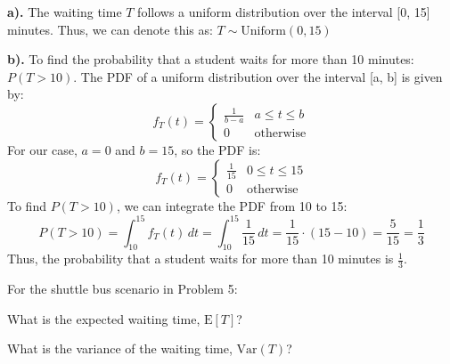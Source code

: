 \documentclass[a4paper, 10pt]{article}
\begin{document}
\begin{solution}
\textbf{a).} The waiting time \( T \) follows a uniform distribution over the interval [0, 15] minutes.
Thus, we can denote this as: \( T \sim \text{Uniform}(0, 15) \)

\vspace{3mm}

\textbf{b).} To find the probability that a student waits for more than 10 minutes: \( P(T > 10) \).
The PDF of a uniform distribution over the interval [a, b] is given by:
\[
f_T(t) = \begin{cases}
    \frac{1}{b-a} & a \leq t \leq b \\
    0 & \text{otherwise}
\end{cases}
\]
For our case, \( a = 0 \) and \( b = 15 \), so the PDF is:
\[
f_T(t) = \begin{cases}
    \frac{1}{15} & 0 \leq t \leq 15 \\
    0 & \text{otherwise}
\end{cases}
\]
To find \( P(T > 10) \), we can integrate the PDF from 10 to 15:
\[
P(T > 10) = \int_{10}^{15} f_T(t) \, dt = \int_{10}^{15} \frac{1}{15} \, dt = \frac{1}{15} \cdot (15 - 10) = \frac{5}{15} = \frac{1}{3}
\]
Thus, the probability that a student waits for more than 10 minutes is \( \boxed{\frac{1}{3}} \).
\end{solution}


\begin{problem}
For the shuttle bus scenario in Problem 5:
\begin{subproblems}
    \item What is the expected waiting time, \( \text{E}[T] \)?
    \item What is the variance of the waiting time, \( \text{Var}(T) \)?
\end{subproblems}
\end{problem}
\end{document}
